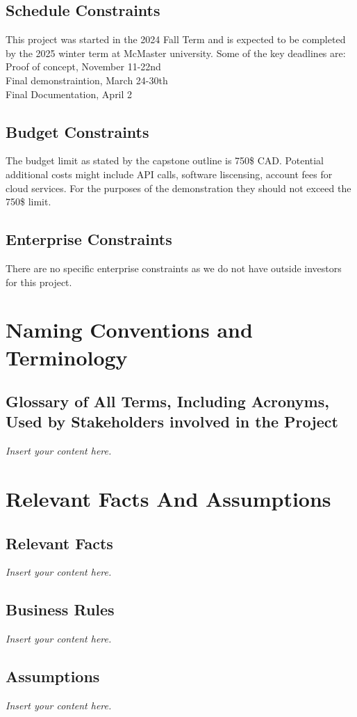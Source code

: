 \documentclass[12pt]{article}
\newcommand{\lips}{\textit{Insert your content here.}}
\begin{document}
\subsection{Schedule Constraints}
This project was started in the 2024 Fall Term and is expected to be completed by the 
2025 winter term at McMaster university. Some of the key deadlines are: \\
Proof of concept, November 11-22nd\\
Final demonstraintion, March 24-30th\\
Final Documentation, April 2\\

\subsection{Budget Constraints}
The budget limit as stated by the capstone outline is 750\$ CAD. Potential additional
costs might include API calls, software liscensing, account fees for cloud services. 
For the purposes of the demonstration they should not exceed the 750\$ limit. 

\subsection{Enterprise Constraints}
There are no specific enterprise constraints as we do not have outside investors
for this project. 

\section{Naming Conventions and Terminology}
\subsection{Glossary of All Terms, Including Acronyms, Used by Stakeholders
involved in the Project}
\lips

\section{Relevant Facts And Assumptions}
\subsection{Relevant Facts}
\lips
\subsection{Business Rules}
\lips
\subsection{Assumptions}
\lips
\end{document}
